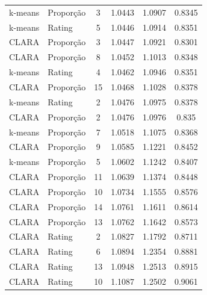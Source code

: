 \documentclass[12pt,a4paper,header]{abnt}
\begin{document}
\begin{longtable}{@{}llcccc@{}}
k-means   & Proporção              & 3          & 1.0443          & 1.0907          & 0.8345          \\
k-means   & Rating                 & 5          & 1.0446          & 1.0914          & 0.8351          \\
CLARA    & Proporção              & 3          & 1.0447          & 1.0921          & 0.8301          \\
CLARA    & Proporção              & 8          & 1.0452          & 1.1013          & 0.8348          \\
k-means   & Rating                 & 4          & 1.0462          & 1.0946          & 0.8351          \\
CLARA    & Proporção              & 15         & 1.0468          & 1.1028          & 0.8378          \\
k-means   & Rating                 & 2          & 1.0476          & 1.0975          & 0.8378          \\
CLARA    & Proporção              & 2          & 1.0476          & 1.0976          & 0.835           \\
k-means   & Proporção              & 7          & 1.0518          & 1.1075          & 0.8368          \\
CLARA    & Proporção              & 9          & 1.0585          & 1.1221          & 0.8452          \\
k-means   & Proporção              & 5          & 1.0602          & 1.1242          & 0.8407          \\
CLARA    & Proporção              & 11         & 1.0639          & 1.1374          & 0.8448          \\
CLARA    & Proporção              & 10         & 1.0734          & 1.1555          & 0.8576          \\
CLARA    & Proporção              & 14         & 1.0761          & 1.1611          & 0.8614          \\
CLARA    & Proporção              & 13         & 1.0762          & 1.1642          & 0.8573          \\
CLARA    & Rating                 & 2          & 1.0827          & 1.1792          & 0.8711          \\
CLARA    & Rating                 & 6          & 1.0894          & 1.2354          & 0.8881          \\
CLARA    & Rating                 & 13         & 1.0948          & 1.2513          & 0.8915          \\
CLARA    & Rating                 & 10         & 1.1087          & 1.2502          & 0.9061          \\

\end{longtable}
\end{document}
